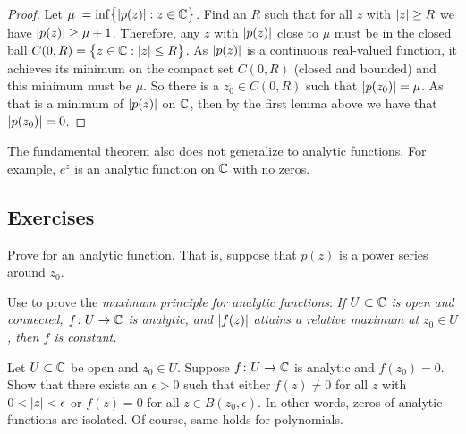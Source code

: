 \begin{proof}
Let $\mu := \inf \bigl\{ \lvert {p(z)} \rvert : z \in {\mathbb{C}} \bigr\}$.  Find an $R$ such that
for all $z$ with $\lvert {z} \rvert \geq R$ we have $\lvert {p(z)} \rvert \geq \mu+1$.
Therefore, any $z$ with $\lvert {p(z)} \rvert$ close to $\mu$ must be in the
closed ball $C(0,R) = \bigl\{ z \in {\mathbb{C}} : \lvert {z} \rvert \leq R \bigr\}$.  As $\lvert {p(z)} \rvert$
is a continuous real-valued function, it achieves its minimum
on the compact set $C(0,R)$ (closed and bounded) and this minimum must
be $\mu$.  So there is a $z_0 \in C(0,R)$ such that $\lvert {p(z_0)} \rvert = \mu$.
As that is a minimum of $\lvert {p(z)} \rvert$ on ${\mathbb{C}}$, then by the first lemma above we have
that $\lvert {p(z_0)} \rvert = 0$.
\end{proof}

The fundamental theorem also does not generalize to analytic functions.  For example,
$e^{z}$ is an analytic function on ${\mathbb{C}}$ with no zeros.

\subsection{Exercises}

\begin{exercise} \label{exercise:minprinciple}
Prove  for an analytic function.  That
is, suppose that $p(z)$ is a power series around $z_0$.
\end{exercise}

\begin{exercise}
Use  to prove the \emph{maximum
principle for analytic functions}:
\emph{If $U \subset {\mathbb{C}}$ is open and connected,
$f \colon U \to {\mathbb{C}}$ is analytic, and $\lvert {f(z)} \rvert$ attains a relative
maximum at $z_0 \in U$, then $f$ is constant.}
\end{exercise}

\begin{exercise}
Let $U \subset {\mathbb{C}}$ be open and $z_0 \in U$.
Suppose $f \colon U \to {\mathbb{C}}$ is analytic and $f(z_0) = 0$.  Show that
there exists an $\epsilon > 0$ such that either
$f(z) \not= 0$ for all $z$ with $0 < \lvert {z} \rvert < \epsilon$
or $f(z) = 0$ for all $z \in B(z_0,\epsilon)$.
In other words, zeros of analytic functions are isolated.
Of course, same holds for polynomials.
\end{exercise}

